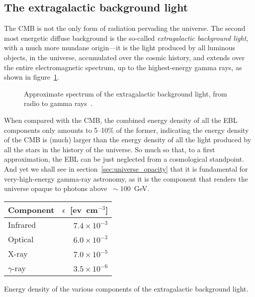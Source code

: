 \subsection{The extragalactic background light}

The CMB is not the only form of radiation pervading the universe. The second most
energetic diffuse background is the so-called \emph{extragalactic background light},
with a much more mundane origin---it is the light produced by all luminous objects,
in the universe, accumulated over the cosmic history, and extends over the entire
electromagnetic spectrum, up to the highest-energy gamma rays, as shown in
figure~\ref{fig:ebl}.

\begin{figure}[!htbp]
  
  \caption{Approximate spectrum of the extragalactic background light, from
		radio to gamma rays~\cite{}.}
  \label{fig:ebl}
\end{figure}

When compared with the CMB, the combined energy density of all the EBL components
only amounts to 5--10\% of the former, indicating the energy density of the CMB
is (much) larger than the energy density of all the light produced by all the stars
in the history of the universe. So much so that, to a first approximation, the
EBL can be just neglected from a cosmological standpoint. And yet we shall see in
section~\ref{sec:universe_opacity} that it is fundamental for very-high-energy
gamma-ray astronomy, as it is the component that renders the universe opaque to
photons above $~\sim 100$~GeV.

\begin{margintable}
	\begin{tabular}{lr}
		\hline
		Component & $\epsilon$~[ev~cm$^{-3}$]\\
		\hline
		\hline
		Infrared & $7.4 \times 10^{-3}$\\
		Optical & $ 6.0 \times 10^{-3}$\\
		X-ray & $ 7.0 \times 10^{-5}$\\
		$\gamma$-ray & $ 3.5 \times 10^{-6}$\\
		\hline
	\end{tabular}
	\caption{Energy density of the various components of the extragalactic background light.}
\end{margintable}


%
%
%
%
